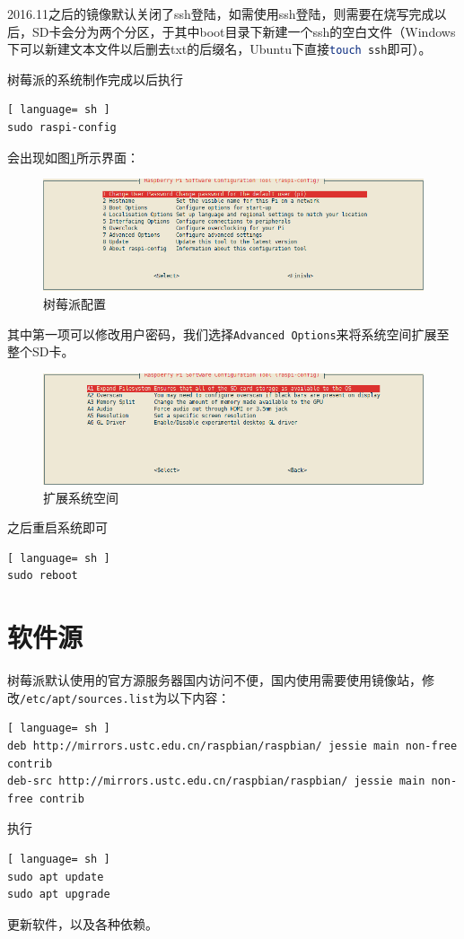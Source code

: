 		\par 2016.11之后的镜像默认关闭了ssh登陆，如需使用ssh登陆，则需要在烧写完成以后，SD卡会分为两个分区，于其中boot目录下新建一个ssh的空白文件（Windows下可以新建文本文件以后删去txt的后缀名，Ubuntu下直接\lstinline[language=sh]{touch ssh}即可）。
		\par 树莓派的系统制作完成以后执行
		\begin{lstlisting}[ language= sh ]
sudo raspi-config
		\end{lstlisting}
		\par 会出现如图\ref{fig:raspi_config}所示界面：
		\begin{figure}[htp]
			\centering
			\includegraphics[width=13cm]{figures/raspi-config.png}
			\caption{树莓派配置}
			\label{fig:raspi_config}
		\end{figure}
		\par 其中第一项可以修改用户密码，我们选择\lstinline{Advanced Options}来将系统空间扩展至整个SD卡。
		\begin{figure}[htp]
			\centering
			\includegraphics[width=13cm]{figures/raspi-config-expand-filesystem.png}
			\caption{扩展系统空间}
			\label{fig:raspi_config_expand_filesystem}
		\end{figure}
		\par 之后重启系统即可
		\begin{lstlisting}[ language= sh ]
sudo reboot
		\end{lstlisting}
	\section{软件源}
		\par 树莓派默认使用的官方源服务器国内访问不便，国内使用需要使用镜像站，修改\lstinline[language=sh]{/etc/apt/sources.list}为以下内容：
		\begin{lstlisting}[ language= sh ]
deb http://mirrors.ustc.edu.cn/raspbian/raspbian/ jessie main non-free contrib 
deb-src http://mirrors.ustc.edu.cn/raspbian/raspbian/ jessie main non-free contrib
		\end{lstlisting}
		\par 执行
		\begin{lstlisting}[ language= sh ]
sudo apt update
sudo apt upgrade
		\end{lstlisting}
		\par 更新软件，以及各种依赖。
